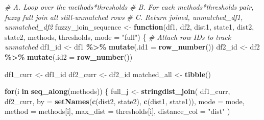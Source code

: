 \documentclass[
]{article}
\newenvironment{Shaded}{\begin{snugshade}}{\end{snugshade}}
\newcommand{\AttributeTok}[1]{\textcolor[rgb]{0.13,0.29,0.53}{#1}}
\newcommand{\CommentTok}[1]{\textcolor[rgb]{0.56,0.35,0.01}{\textit{#1}}}
\newcommand{\ControlFlowTok}[1]{\textcolor[rgb]{0.13,0.29,0.53}{\textbf{#1}}}
\newcommand{\FunctionTok}[1]{\textcolor[rgb]{0.13,0.29,0.53}{\textbf{#1}}}
\newcommand{\NormalTok}[1]{#1}
\newcommand{\OtherTok}[1]{\textcolor[rgb]{0.56,0.35,0.01}{#1}}
\newcommand{\SpecialCharTok}[1]{\textcolor[rgb]{0.81,0.36,0.00}{\textbf{#1}}}
\newcommand{\StringTok}[1]{\textcolor[rgb]{0.31,0.60,0.02}{#1}}
\begin{document}
\begin{Shaded}
\begin{Highlighting}[]
\CommentTok{\# A. Loop over the methods*thresholds}
\CommentTok{\# B. For each methods*thresholds pair, fuzzy full join all still‑unmatched rows}
\CommentTok{\# C. Return joined, unmatched\_df1, unmatched\_df2}
\NormalTok{fuzzy\_join\_sequence }\OtherTok{\textless{}{-}} \ControlFlowTok{function}\NormalTok{(df1, df2,}
\NormalTok{                                dist1, state1,}
\NormalTok{                                dist2, state2,}
\NormalTok{                                methods, thresholds, }\AttributeTok{mode =} \StringTok{"full"}\NormalTok{) \{}
  \CommentTok{\# Attach row IDs to track unmatched}
\NormalTok{  df1\_id }\OtherTok{\textless{}{-}}\NormalTok{ df1 }\SpecialCharTok{\%\textgreater{}\%} \FunctionTok{mutate}\NormalTok{(}\AttributeTok{.id1 =} \FunctionTok{row\_number}\NormalTok{())}
\NormalTok{  df2\_id }\OtherTok{\textless{}{-}}\NormalTok{ df2 }\SpecialCharTok{\%\textgreater{}\%} \FunctionTok{mutate}\NormalTok{(}\AttributeTok{.id2 =} \FunctionTok{row\_number}\NormalTok{())}
  
\NormalTok{  df1\_curr }\OtherTok{\textless{}{-}}\NormalTok{ df1\_id}
\NormalTok{  df2\_curr }\OtherTok{\textless{}{-}}\NormalTok{ df2\_id}
\NormalTok{  matched\_all }\OtherTok{\textless{}{-}} \FunctionTok{tibble}\NormalTok{()}
  
  \ControlFlowTok{for}\NormalTok{(i }\ControlFlowTok{in} \FunctionTok{seq\_along}\NormalTok{(methods)) \{}
\NormalTok{    full\_j }\OtherTok{\textless{}{-}} \FunctionTok{stringdist\_join}\NormalTok{(}
\NormalTok{      df1\_curr, df2\_curr,}
      \AttributeTok{by =} \FunctionTok{setNames}\NormalTok{(}\FunctionTok{c}\NormalTok{(dist2, state2), }\FunctionTok{c}\NormalTok{(dist1, state1)),}
      \AttributeTok{mode =}\NormalTok{ mode,}
      \AttributeTok{method =}\NormalTok{ methods[i],}
      \AttributeTok{max\_dist =}\NormalTok{ thresholds[i],}
      \AttributeTok{distance\_col =} \StringTok{"dist"}
\NormalTok{    )}
    

\end{Highlighting}
\end{Shaded}
\end{document}
